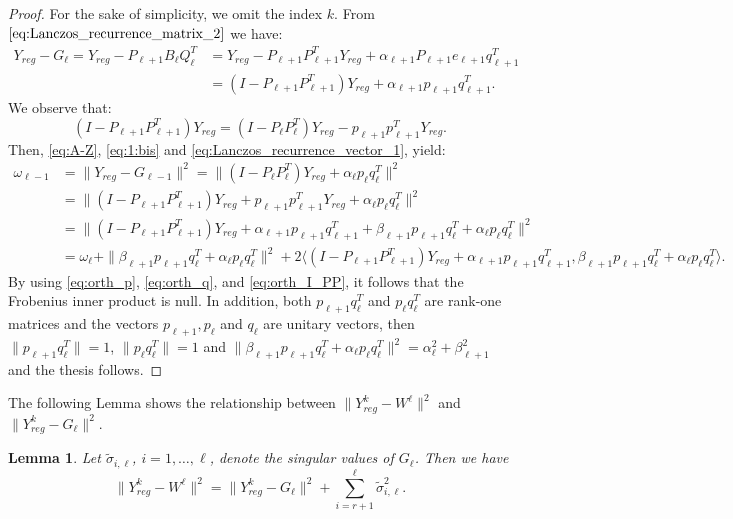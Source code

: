 \documentclass[pdflatex,sn-mathphys-num]{sn-jnl}
\numberwithin{equation}{section}%
\newcommand{\Yck}{{Y_{reg}^k}}
\newcommand{\cZ}{G}
\theoremstyle{thmstyleone}%
\newtheorem{lemma}[theorem]{Lemma}%
\theoremstyle{thmstyletwo}%
\theoremstyle{thmstylethree}%
\begin{document}
\begin{proof}
For the sake of simplicity, we omit the index $k$. From $\eqref{eq:Lanczos_recurrence_matrix_2}$ we have:
\begin{align}
    Y_{reg} - G_\ell = Y_{reg} - P_{\ell+1} B_\ell Q_\ell^T &= Y_{reg} - P_{\ell+1} P_{\ell+1}^T Y_{reg}+ \alpha_{\ell+1} P_{\ell+1} e_{\ell+1} q_{\ell+1}^T \nonumber\\
    &= (I - P_{\ell+1} P_{\ell+1}^T) Y_{reg} + \alpha_{\ell+1} p_{\ell+1} q_{\ell+1}^T. \label{eq:A-Z}
\end{align}
We observe that:
\begin{equation}
    \label{eq:1:bis}
    (I - P_{\ell+1} P_{\ell+1}^T) Y_{reg} = (I - P_{\ell} P_{\ell}^T) Y_{reg} - p_{\ell+1} p_{\ell+1}^T Y_{reg}.
\end{equation}
Then, \eqref{eq:A-Z}, \eqref{eq:1:bis} and \eqref{eq:Lanczos_recurrence_vector_1}, yield:
\begin{align*}
    \omega_{\ell-1} &= \| Y_{reg}-G_{\ell-1} \| ^2 = \| (I - P_{\ell} P_{\ell}^T) Y_{reg} +\alpha_{\ell} p_{\ell} q_{\ell}^T \| ^2 \\
    &= \| (I - P_{\ell+1} P_{\ell+1}^T) Y_{reg} + {p_{\ell+1} p_{\ell+1}^T Y_{reg}} + \alpha_{\ell} p_{\ell} q_{\ell}^T \| ^2 \\
    &= \| (I - P_{\ell+1} P_{\ell+1}^T) Y_{reg} + {\alpha_{\ell+1} p_{\ell+1} q_{\ell+1}^T + \beta_{\ell+1} p_{\ell+1} q_{\ell}^T} + \alpha_{\ell} p_{\ell} q_{\ell}^T \| ^2 \\
    &= {\omega_{\ell}}  + \| \beta_{\ell+1} p_{\ell+1} q_{\ell}^T + \alpha_{\ell} p_{\ell} q_{\ell}^T \| ^2 + 2 \langle (I - P_{\ell+1} P_{\ell+1}^T) Y_{reg} + \alpha_{\ell+1} p_{\ell+1} q_{\ell+1}^T, \beta_{\ell+1} p_{\ell+1} q_{\ell}^T + \alpha_{\ell} p_{\ell} q_{\ell}^T \rangle.
\end{align*}
By using \eqref{eq:orth_p}, \eqref{eq:orth_q}, and \eqref{eq:orth_I_PP}, it follows that the Frobenius inner product is null. In addition, both $p_{\ell+1} q_{\ell}^T$ and $p_{\ell} q_{\ell}^T$ are rank-one matrices and the vectors  $p_{\ell+1},p_{\ell}$ and $q_{\ell}$ are unitary vectors, then $\|p_{\ell+1} q_{\ell}^T\| =1$, $\|p_{\ell} q_{\ell}^T\| =1$ and $\| \beta_{\ell+1} p_{\ell+1} q_{\ell}^T + \alpha_{\ell} p_{\ell} q_{\ell}^T \| ^2 = \alpha_{\ell}^2 + \beta_{\ell+1}^2$ and the thesis follows.
\end{proof}

The following Lemma shows the relationship between $\| \Yck - W^\ell \| ^2$ and $\|\Yck-\cZ_\ell \| ^2$.
\begin{lemma}\label{lem:criterion2}
    Let $\tilde \sigma_{i,\ell}$, $i=1,\ldots,\ell$, denote the singular values of $\cZ_\ell$. Then we have
	\[
        \| \Yck - W^\ell \| ^2 = \| \Yck-\cZ_\ell \| ^2 + \sum_{i=r+1}^\ell \tilde \sigma_{i,\ell}^2.
	\]
\end{lemma}
\end{document}

